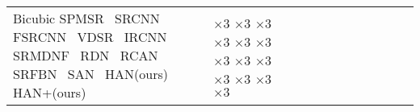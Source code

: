 \documentclass[runningheads]{llncs}
\begin{document}
\begin{table}[t]
\begin{tabular}{|p{6.5em}|p{2.5em}|p{2.5em}|p{3em}|p{2.5em}|p{3em}|p{2.5em}|p{3em}|p{2.5em}|p{3em}|p{2.5em}|p{3em}|}
		Bicubic \newline{}SPMSR~\cite{peleg2014statistical} \newline{}SRCNN~\cite{dong2014learning}  \newline{}FSRCNN~\cite{dong2016accelerating} \newline{}VDSR~\cite{kim2016accurate} \newline{}IRCNN~\cite{zhang2017learning}  \newline{}SRMDNF~\cite{zhang2018learning} \newline{}RDN~\cite{zhang2018residual} \newline{}RCAN~\cite{zhang2018image} \newline{} SRFBN~\cite{li2019feedback} \newline{} SAN~\cite{dai2019second} \newline{} HAN(ours) \newline{} HAN+(ours)	& 
		$\times3$ \newline{}$\times3$ \newline{}$\times3$ \newline{}$\times3$ \newline{}$\times3$ \newline{}$\times3$ \newline{}$\times3$ \newline{}$\times3$ \newline{}$\times3$ \newline{} $\times3$ \newline{}$\times3$ \newline{}$\times3$ \newline{}$\times3$ 

\end{tabular}
\end{table}
\end{document}
